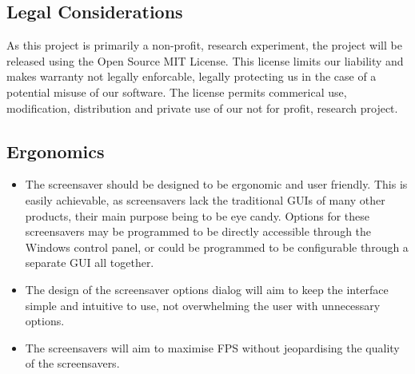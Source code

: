 \documentclass[10pt, openany]{book}
\begin{document}
\subsection{Legal Considerations}
As this project is primarily a non-profit, research experiment, the project will be released using the Open Source MIT License. This license limits our liability and makes warranty not legally enforcable, legally protecting us in the case of a potential misuse of our software. The license permits commerical use, modification, distribution and private use of our not for profit, research project.

\subsection{Ergonomics}
\begin{itemize}
	\item The screensaver should be designed to be ergonomic and user friendly. This is easily achievable, as screensavers lack the traditional GUIs of many other products, their main purpose being to be eye candy. Options for these screensavers may be programmed to be directly accessible through the Windows control panel, or could be programmed to be configurable through a separate GUI all together.
	\item The design of the screensaver options dialog will aim to keep the interface simple and intuitive to use, not overwhelming the user with unnecessary options. 
	\item The screensavers will aim to maximise FPS without jeopardising the quality of the screensavers.	
\end{itemize}	
\end{document}
